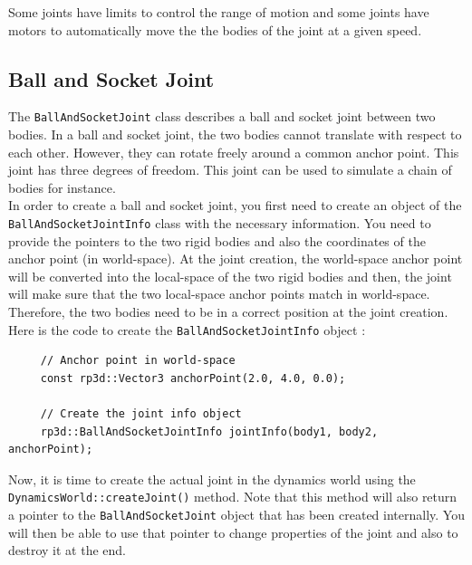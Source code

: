 \documentclass[a4paper,12pt]{article}
\begin{document}
    Some joints have limits to control the range of motion and some joints have motors to automatically move the the bodies of the joint at a given speed. \\
    
    \subsection{Ball and Socket Joint}

    The \texttt{BallAndSocketJoint} class describes a ball and socket joint between two bodies. In a ball and socket joint, the two bodies cannot translate with respect to each other.
    However, they can rotate freely around a common anchor point. This joint has three degrees of freedom. This joint can be used to simulate a chain of bodies for instance. \\

    In order to create a ball and socket joint, you first need to create an object of the \texttt{BallAndSocketJointInfo} class with the necessary information. You need to provide the pointers to the
    two rigid bodies and also the coordinates of the anchor point (in world-space). At the joint creation, the world-space anchor point will be converted into the local-space of the two rigid
    bodies and then, the joint will make sure that the two local-space anchor points match in world-space. Therefore, the two bodies need to be in a correct position at the joint creation. \\

    Here is the code to create the \texttt{BallAndSocketJointInfo} object : \\

    \begin{lstlisting}
     // Anchor point in world-space
     const rp3d::Vector3 anchorPoint(2.0, 4.0, 0.0);

     // Create the joint info object
     rp3d::BallAndSocketJointInfo jointInfo(body1, body2, anchorPoint);
  \end{lstlisting}

    \vspace{0.6cm}

    Now, it is time to create the actual joint in the dynamics world using the \texttt{DynamicsWorld::createJoint()} method.
    Note that this method will also return a pointer to the \texttt{BallAndSocketJoint} object that has been created internally. You will then
    be able to use that pointer to change properties of the joint and also to destroy it at the end. \\
\end{document}
